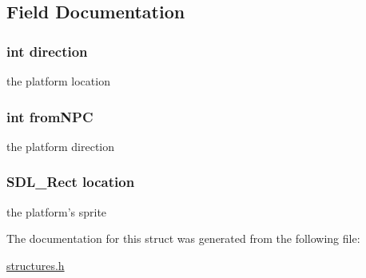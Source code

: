\subsection{Field Documentation}
\hypertarget{structprojectile_a886d551d5381dc3e53f17825ffc51641}{
\subsubsection[{direction}]{\setlength{\rightskip}{0pt plus 5cm}int direction}}\label{structprojectile_a886d551d5381dc3e53f17825ffc51641}
the platform location \hypertarget{structprojectile_a130dff78b354d57d5b6dadcad3e597ef}{
\subsubsection[{from\-N\-P\-C}]{\setlength{\rightskip}{0pt plus 5cm}int from\-N\-P\-C}}\label{structprojectile_a130dff78b354d57d5b6dadcad3e597ef}
the platform direction \hypertarget{structprojectile_a08e7ab1c2395b84bea7ca13eb99bac60}{
\subsubsection[{location}]{\setlength{\rightskip}{0pt plus 5cm}S\-D\-L\-\_\-\-Rect location}}\label{structprojectile_a08e7ab1c2395b84bea7ca13eb99bac60}
the platform's sprite 

The documentation for this struct was generated from the following file\-:\begin{DoxyCompactItemize}
\item 
\hyperlink{structures_8h}{structures.\-h}\end{DoxyCompactItemize}
